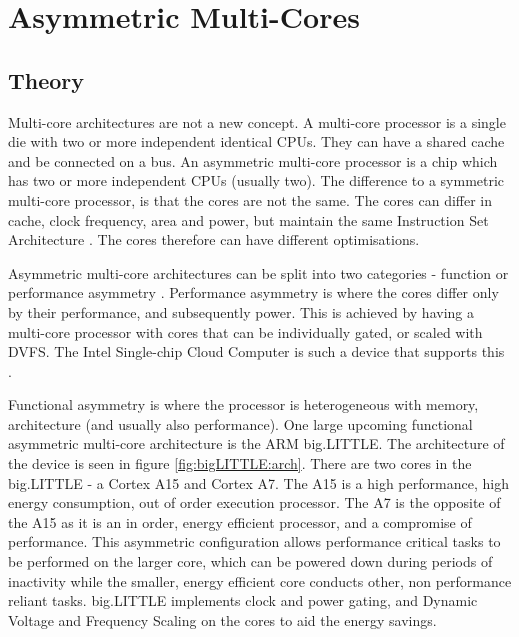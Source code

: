 
\section{Asymmetric Multi-Cores}

\subsection{Theory}
Multi-core architectures are not a new concept. 
A multi-core processor is a single die with two or more independent identical CPUs. 
They can have a shared cache and be connected on a bus.
An asymmetric multi-core processor is a chip which has two or more independent CPUs (usually two).
The difference to a symmetric multi-core processor, is that the cores are not the same. 
The cores can differ in cache, clock frequency, area and power, but maintain the same Instruction Set Architecture \cite{de2012power}.
The cores therefore can have different optimisations.


Asymmetric multi-core architectures can be split into two categories - function or performance asymmetry \cite{wang2012energy}.
Performance asymmetry is where the cores differ only by their performance, and subsequently power. 
This is achieved by having a multi-core processor with cores that can be individually gated, or scaled with DVFS.
The Intel Single-chip Cloud Computer is such a device that supports this \cite{IntelSCC}.

Functional asymmetry is where the processor is heterogeneous with memory, architecture (and usually also performance).
One large upcoming functional asymmetric multi-core architecture is the ARM big.LITTLE. 
The architecture of the device is seen in figure \ref{fig:bigLITTLE:arch}.
There are two cores in the big.LITTLE - a Cortex A15 and Cortex A7.
The A15 is a high performance, high energy consumption, out of order execution processor.%
The A7 is the opposite of the A15 as it is an in order, energy efficient processor, and a compromise of performance.
This asymmetric configuration allows performance critical tasks to be performed on the larger core, which can be powered down during periods of inactivity while the smaller, energy efficient core conducts other, non performance reliant tasks.
big.LITTLE implements clock and power gating, and Dynamic Voltage and Frequency Scaling on the cores to aid the energy savings.



